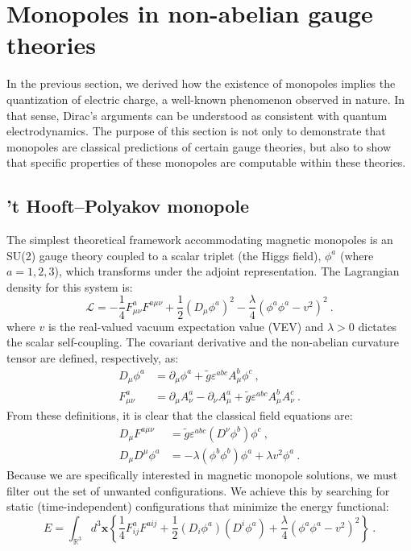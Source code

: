 \documentclass[a4paper,11pt]{article}
\begin{document}
\section{Monopoles in non-abelian gauge theories}
In the previous section, we derived how the existence of monopoles implies the quantization of electric charge, a well-known phenomenon observed in nature. In that sense, Dirac's arguments can be understood as consistent with quantum electrodynamics. The purpose of this section is not only to demonstrate that monopoles are classical predictions of certain gauge theories, but also to show that specific properties of these monopoles are computable within these theories.
 \subsection{'t Hooft–Polyakov monopole}
The simplest theoretical framework accommodating magnetic monopoles is an SU(2) gauge theory coupled to a scalar triplet (the Higgs field), $\phi^a$ (where $a=1,2,3$), which transforms under the adjoint representation. The Lagrangian density for this system is:
\begin{equation}
    \mathcal{L} = -\frac{1}{4} F_{\mu\nu}^a F^{a\mu\nu} + \frac{1}{2} (D_\mu \phi^a)^2 - \frac{\lambda}{4} (\phi^a \phi^a - v^2)^2\ .
\end{equation}
where $v$ is the real-valued vacuum expectation value (VEV) and $\lambda > 0$ dictates the scalar self-coupling. The covariant derivative and the non-abelian curvature tensor are defined, respectively, as:
\begin{align}
     D_\mu \phi^a &= \partial_\mu \phi^a + \tilde{g} \varepsilon^{abc} A_\mu^b \phi^c\ ,\\
F_{\mu\nu}^a &= \partial_\mu A_\nu^a - \partial_\nu A_\mu^a + \tilde{g} \varepsilon^{abc} A_\mu^b A_\nu^c\ .
\end{align}
From these definitions, it is clear that the classical field equations are:
\begin{align}
      D_\mu F^{a\mu\nu} &= \tilde{g} \varepsilon^{abc} (D^\nu \phi^b) \phi^c\ , \\
 D_\mu D^\mu \phi^a &= - \lambda (\phi^b \phi^b) \phi^a + \lambda v^2 \phi^a\ .
\end{align}
Because we are specifically interested in magnetic monopole solutions, we must filter out the set of unwanted configurations. We achieve this by searching for static (time-independent) configurations that minimize the energy functional:
\begin{equation}\label{energyfunctional}
    E = \int_{\mathbb R^3} d^3\boldsymbol x \left\{ \frac{1}{4} F_{ij}^a F^{aij} + \frac{1}{2} (D_i \phi^a)(D^i \phi^a) + \frac{\lambda}{4} (\phi^a \phi^a - v^2)^2 \right\}\ .
\end{equation}
\end{document}
